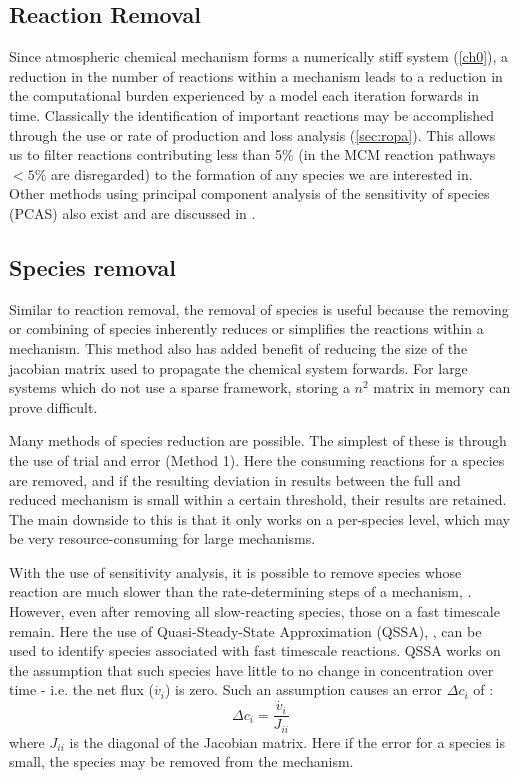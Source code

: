 \subsection{Reaction Removal}
Since atmospheric chemical mechanism forms a numerically stiff system (\autoref{ch0}), a reduction in the number of reactions within a mechanism leads to a reduction in the computational burden experienced by a model each iteration forwards in time. Classically the identification of important reactions may be accomplished through the use or rate of production and loss analysis (\autoref{sec:ropa}). This allows us to filter reactions contributing less than 5\% (in the MCM reaction pathways $<5\%$ are disregarded) to the formation of any species we are interested in. Other methods using principal component analysis of the sensitivity of species (PCAS) also exist and are discussed in \citep{PCAS,wyche}.


\subsection{Species removal}
Similar to reaction removal, the removal of species is useful because the removing or combining of species inherently reduces or simplifies the reactions within a mechanism.  This method also has added benefit of reducing the size of the jacobian matrix used to propagate the chemical system forwards. For large systems which do not use a sparse framework, storing a $n^2$ matrix in memory can prove difficult.

Many methods of species reduction are possible. The simplest of these is through the use of trial and error \citep{tur1990} (Method 1). Here the consuming reactions for a species are removed, and if the resulting deviation in results between the full and reduced mechanism is small within a certain threshold, their results are retained. The main downside to this is that it only works on a per-species level, which may be very resource-consuming for large mechanisms.

With the use of sensitivity analysis, it is possible to remove species whose reaction are much slower than the rate-determining steps of a mechanism, \citep{frenk}. However, even after removing all slow-reacting species, those on a fast timescale remain. Here the use of Quasi-Steady-State Approximation (QSSA), \citep{QSSA}, can be used to identify species associated with fast timescale reactions. QSSA works on the assumption that such species have little to no change in concentration over time - i.e. the net flux ($\dot{v_i}$) is zero. Such an assumption causes an error $\Delta c_i$ of :
\begin{equation}
    \Delta c_i = \frac{\dot{v_i}}{J_{ii}}
\end{equation}
where $J_{ii}$ is the diagonal of the Jacobian matrix. Here if the error for a species is small, the species may be removed from the mechanism.


